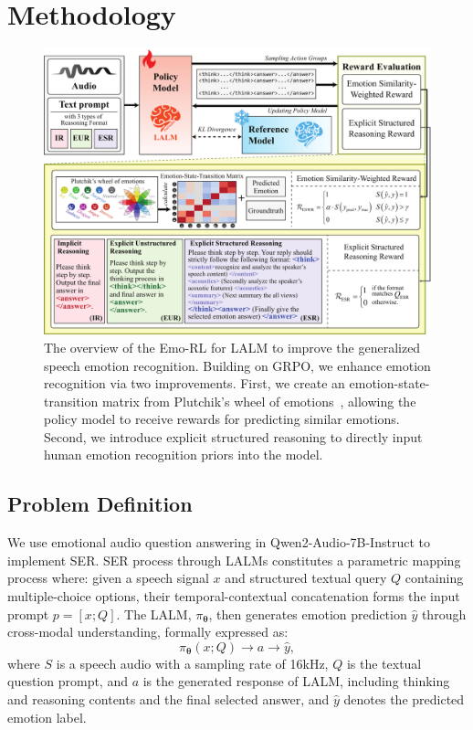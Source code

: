 \documentclass[11pt]{article}
\begin{document}
\section{Methodology}
\begin{figure}[h]
	\centering
	\includegraphics[width=0.99\linewidth]{./img/framework.pdf}
	\caption{The overview of the Emo-RL for LALM to improve the generalized speech emotion recognition. Building on GRPO, we enhance emotion recognition via two improvements. First, we create an emotion-state-transition matrix from Plutchik's wheel of emotions~\cite{plutchik1982psychoevolutionary}, allowing the policy model to receive rewards for predicting similar emotions. Second, we introduce explicit structured reasoning to directly input human emotion recognition priors into the model.}
	\label{fig:main_figure}
	\vspace{-0.5cm}
\end{figure}

\subsection{Problem Definition}
We use emotional audio question answering in Qwen2-Audio-7B-Instruct to implement SER.
SER process through LALMs constitutes a parametric mapping process where: given a speech signal $x$ and structured textual query $Q$ containing multiple-choice options, their temporal-contextual concatenation forms the input prompt $p=[x;Q]$. The LALM, $\pi_{\boldsymbol{\theta}}$, then generates emotion prediction $\hat{y}$ through cross-modal understanding, formally expressed as:
\begin{equation}
	\pi_{\boldsymbol{\theta}}(x; Q)\to a \to \hat{y},
	\label{forward}
\end{equation}
where $S$ is a speech audio with a sampling rate of 16kHz, $Q$ is the textual question prompt, and $a$ is the generated response of LALM, including thinking and reasoning contents and the final selected answer, and $\hat{y}$ denotes the predicted emotion label.
\end{document}
